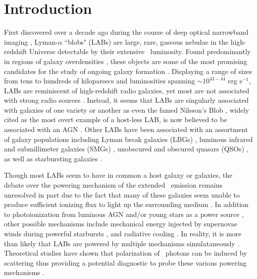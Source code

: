 \section{Introduction}\label{sec: intro}

First discovered over a decade ago during the course of deep optical narrowband imaging \citep{Francis1996, Steidel2000}, Lyman-$\alpha$ ``blobs" (LABs) are large, rare, gaseous nebulae in the high-redshift Universe detectable by their extensive \lya~luminosity.  Found predominantly in regions of galaxy overdensities \citep{Palunas2004, Matsuda2004, Prescott2008, Yang2009}, these objects are some of the most promising candidates for the study of ongoing galaxy formation \citep{Mori2006}.  Displaying a range of sizes from tens to hundreds of kiloparsecs and luminosities spanning $\sim10^{43-44}$ erg s$^{-1}$, LABs are reminiscent of high-redshift radio galaxies, yet most are not associated with strong radio sources \citep{Saito2006}. Instead, it seems that LABs are singularly associated with galaxies of one variety or another as even the famed Nilsson's Blob \citep{Nilsson2006}, widely cited as the most overt example of a host-less LAB,  is now believed to be associated with an AGN \citep{Prescott2015}. Other LABs have been associated with an assortment of galaxy populations including Lyman break galaxies (LBGs) \citep{Matsuda2004}, luminous infrared and submillimeter galaxies (SMGs) \citep{Geach2005, Geach2007, Yang2012}, unobscured and obscured quasars (QSOs) \citep{Bunker2003, Weidinger2004, Basu-Zych2004, Smith2009}, as well as starbursting galaxies \citep{Scarlata2009, Colbert2011}.  

Though most LABs seem to have in common a host galaxy or galaxies, the debate over the powering mechanism of the extended \lya~emission remains unresolved in part due to the fact that many of these galaxies seem unable to produce sufficient ionizing flux to light up the surrounding medium \citep{Matsuda2004, SmithJarvis2007}. In addition to photoionization from luminous AGN and/or young stars as a power source \citep{ HaimanRees2001, Jimenez2006, Geach2009, Cantalupo2012}, other possible mechanisms include mechanical energy injected by supernovae winds during powerful starbursts \citep{Taniguchi2000, Scarlata2009}, and radiative cooling \citep{Haiman2000, Fardal2001, DijkstraLoeb2009, Faucher-Giguere2010, Rosdahl2012}. In reality, it is more than likely that LABs are powered by multiple mechanisms simulataneously \citep{Furlanetto2005}. Theoretical studies have shown that polarization of  \lya~photons can be induced by scattering thus providing a potential diagnostic to probe these various powering mechanisms \citep{LeeAhn1998, RybickiLoeb1999, LoebRybicki1999, DijkstraLoeb2008}. 

